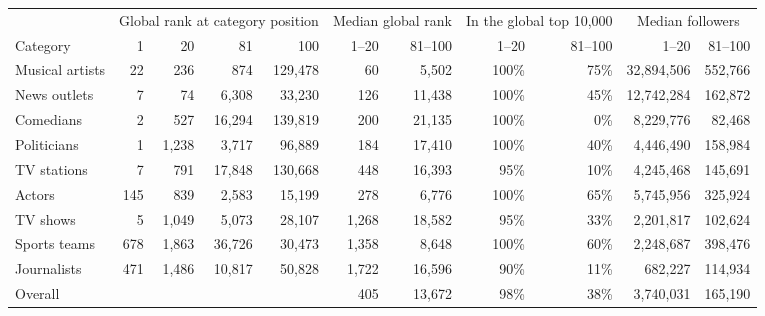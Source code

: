 \begin{tabular}{lrrrrrrrrrr}
\toprule
 & \multicolumn{4}{c}{Global rank at category position} & \multicolumn{2}{c}{Median global rank} & \multicolumn{2}{c}{In the global top 10,000} & \multicolumn{2}{c}{Median followers} \\
Category & 1 & 20 & 81 & 100 & 1--20 & 81--100 & 1--20 & 81--100 & 1--20 & 81--100 \\
\midrule
Musical artists & 22 & 236 & 874 & 129,478 & 60 & 5,502 & 100\% & 75\% & 32,894,506 & 552,766 \\
News outlets & 7 & 74 & 6,308 & 33,230 & 126 & 11,438 & 100\% & 45\% & 12,742,284 & 162,872 \\
Comedians & 2 & 527 & 16,294 & 139,819 & 200 & 21,135 & 100\% & 0\% & 8,229,776 & 82,468 \\
Politicians & 1 & 1,238 & 3,717 & 96,889 & 184 & 17,410 & 100\% & 40\% & 4,446,490 & 158,984 \\
TV stations & 7 & 791 & 17,848 & 130,668 & 448 & 16,393 & 95\% & 10\% & 4,245,468 & 145,691 \\
Actors & 145 & 839 & 2,583 & 15,199 & 278 & 6,776 & 100\% & 65\% & 5,745,956 & 325,924 \\
TV shows & 5 & 1,049 & 5,073 & 28,107 & 1,268 & 18,582 & 95\% & 33\% & 2,201,817 & 102,624 \\
Sports teams & 678 & 1,863 & 36,726 & 30,473 & 1,358 & 8,648 & 100\% & 60\% & 2,248,687 & 398,476 \\
Journalists & 471 & 1,486 & 10,817 & 50,828 & 1,722 & 16,596 & 90\% & 11\% & 682,227 & 114,934 \\
\midrule
Overall &  &  &  &  & 405 & 13,672 & 98\% & 38\% & 3,740,031 & 165,190 \\
\bottomrule
\end{tabular}
